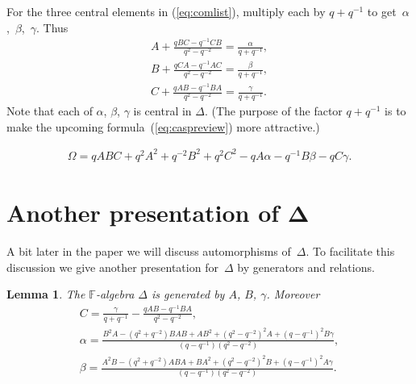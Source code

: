 \documentclass[11pt]{article}
\numberwithin{equation}{section}
\newtheorem{Lemma}[Theorem]{Lemma}
\begin{document}
\begin{Definition}
\label{def:abc}
\rm
For the
three central elements in
(\ref{eq:comlist}), multiply each by $q+q^{-1}$ to get~$\alpha$,~$\beta$,~$\gamma$. Thus
\begin{gather}
A+ \frac{qBC-q^{-1}CB}{q^2-q^{-2}}
=
\frac{\alpha}{q+q^{-1}},
\label{eq:u1}
\\
B+
\frac{qCA-q^{-1}AC}{q^2-q^{-2}}
=
\frac{\beta}{q+q^{-1}},
\label{eq:u2}
\\
C+
\frac{qAB-q^{-1}BA}{q^2-q^{-2}}
=
\frac{\gamma}{q+q^{-1}}.
\label{eq:u3}
\end{gather}
Note that each of $\alpha$, $\beta$, $\gamma$ is central in
$\Delta$.
(The purpose of the factor $q+q^{-1}$ is
to make the upcoming formula~(\ref{eq:caspreview})
more attractive.)
\end{Definition}
\setcounter{section}{1}
\setcounter{subsection}{0}
\setcounter{subsubsection}{0}
\setcounter{Theorem}{4}
\setcounter{equation}{4}
\begin{gather}
\label{eq:caspreview}
\Omega =
qABC+q^2A^2+q^{-2}B^2+q^2C^2-qA\alpha-q^{-1}B\beta -q C\gamma.
\end{gather}
\setcounter{section}{1}
\setcounter{subsection}{0}
\setcounter{subsubsection}{0}
\setcounter{Theorem}{4}
\setcounter{equation}{5}
\section[Another presentation of $\Delta$]{Another presentation of $\boldsymbol{\Delta}$}


A bit later in the paper
we will discuss automorphisms of~$\Delta $.
To facilitate this discussion
we give
another presentation for~$\Delta $ by generators and relations.

\begin{Lemma}
\label{lem:abgpres}
The $\mathbb F$-algebra $\Delta $ is generated by
$A$, $B$, $\gamma$. Moreover
\begin{gather}
C  =  \frac{\gamma}{q+q^{-1}}
-\frac{qAB-q^{-1}BA}{q^2-q^{-2}},
\label{eq:getc}
\\
\alpha  =  \frac{B^2A-(q^2+q^{-2})BAB+AB^2+
(q^2-q^{-2})^2A+(q-q^{-1})^2B\gamma}{(q-q^{-1})(q^2-q^{-2})},
\label{eq:getalpha}
\\
\beta  =  \frac{A^2B-(q^2+q^{-2})ABA+BA^2+
(q^2-q^{-2})^2B+(q-q^{-1})^2A\gamma}{(q-q^{-1})(q^2-q^{-2})}.
\label{eq:getbeta}
\end{gather}
\end{Lemma}
\end{document}
